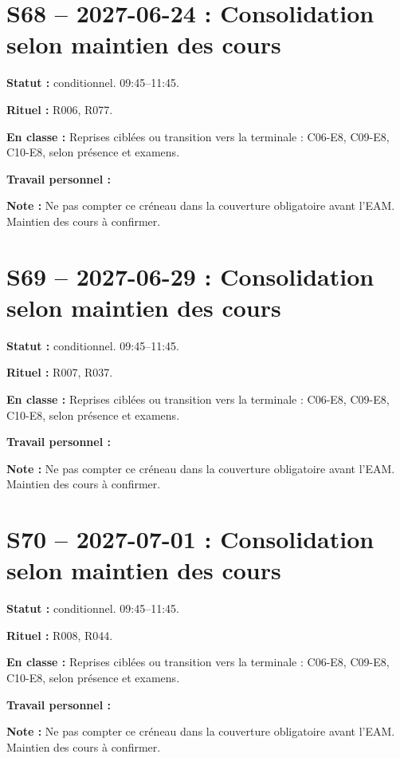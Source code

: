 \section*{S68 -- 2027-06-24 : Consolidation selon maintien des cours}
\textbf{Statut :} conditionnel. 09:45–11:45.\par\textbf{Rituel :} R006, R077.\par\textbf{En classe :} Reprises ciblées ou transition vers la terminale : C06-E8, C09-E8, C10-E8, selon présence et examens.\par\textbf{Travail personnel :} \par\textbf{Note :} Ne pas compter ce créneau dans la couverture obligatoire avant l’EAM. Maintien des cours à confirmer.
\section*{S69 -- 2027-06-29 : Consolidation selon maintien des cours}
\textbf{Statut :} conditionnel. 09:45–11:45.\par\textbf{Rituel :} R007, R037.\par\textbf{En classe :} Reprises ciblées ou transition vers la terminale : C06-E8, C09-E8, C10-E8, selon présence et examens.\par\textbf{Travail personnel :} \par\textbf{Note :} Ne pas compter ce créneau dans la couverture obligatoire avant l’EAM. Maintien des cours à confirmer.
\section*{S70 -- 2027-07-01 : Consolidation selon maintien des cours}
\textbf{Statut :} conditionnel. 09:45–11:45.\par\textbf{Rituel :} R008, R044.\par\textbf{En classe :} Reprises ciblées ou transition vers la terminale : C06-E8, C09-E8, C10-E8, selon présence et examens.\par\textbf{Travail personnel :} \par\textbf{Note :} Ne pas compter ce créneau dans la couverture obligatoire avant l’EAM. Maintien des cours à confirmer.
